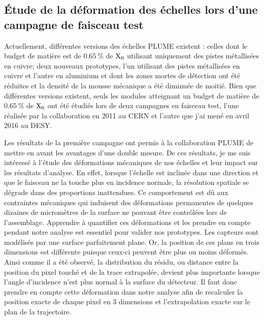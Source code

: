     \subsection{Étude de la déformation des échelles lors d'une campagne de faisceau test}

  Actuellement, différentes versions des échelles PLUME existent : celles dont le budget de matière est de $0.65~\%$ de $\rm{X_0}$ utilisant uniquement des pistes métallisées en cuivre; deux nouveaux prototypes, l'un utilisant des pistes métallisées en cuivre et l'autre en aluminium et dont les zones mortes de détection ont été réduites et la densité de la mousse mécanique a été diminuée de moitié.
  Bien que différentes versions existent, seuls les modules atteignant un budget de matière de $0.65~\%$ de $\rm{X_0}$ ont été étudiés lors de deux campagnes en faisceau test, l'une réalisée par la collaboration en 2011 au CERN et l'autre que j'ai mené en avril 2016 au DESY.

  Les résultats de la première campagne ont permis à la collaboration \gls{PLUME} de mettre en avant les avantages d'une double mesure. 
  De ces résultats, je me suis intéressé à l'étude des déformations mécaniques de nos échelles et leur impact sur les résultats d'analyse.
  En effet, lorsque l'échelle est inclinée dans une direction et que le faisceau ne la touche plus en incidence normale, la résolution spatiale se dégrade dans des proportions inattendues.
  Ce comportement est dû aux contraintes mécaniques qui induisent des déformations permanentes de quelques dizaines de micromètres de la surface ne pouvant être contrôlées lors de l'assemblage.
  Apprendre à quantifier ces déformations et les prendre en compte pendant notre analyse est essentiel pour valider nos prototypes.
  Les capteurs sont modélisés par une surface parfaitement plane.
  Or, la position de ces plans en trois dimensions est différente puisque ceux-ci peuvent être plus ou moins déformés.
  Ainsi comme il a été observé, la distribution du résidu, ou distance entre la position du pixel touché et de la trace extrapolée, devient plus importante lorsque l'angle d'incidence n'est plus normal à la surface du détecteur.
  Il faut donc prendre en compte cette déformation dans notre analyse afin de recalculer la position exacte de chaque pixel en 3 dimensions et l'extrapolation exacte sur le plan de la trajectoire. 
  
